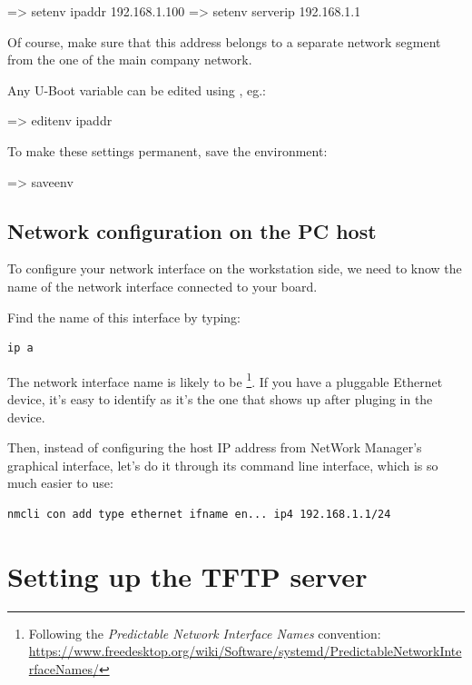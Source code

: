 \begin{ubootinput}
=> setenv ipaddr 192.168.1.100
=> setenv serverip 192.168.1.1
\end{ubootinput}

Of course, make sure that this address belongs to a separate network
segment from the one of the main company network.

Any U-Boot variable can be edited using , eg.:

\begin{ubootinput}
=> editenv ipaddr
\end{ubootinput}

To make these settings permanent, save the environment:

\begin{ubootinput}
=> saveenv
\end{ubootinput}

\subsection{Network configuration on the PC host}

To configure your network interface on the workstation side, we need
to know the name of the network interface connected to your board.

Find the name of this interface by typing:

\begin{verbatim}
ip a
\end{verbatim}

The network interface name is likely to be
\footnote{Following the {\em Predictable Network Interface
Names} convention:
\url{https://www.freedesktop.org/wiki/Software/systemd/PredictableNetworkInterfaceNames/}}.
If you have a pluggable Ethernet device, it's easy to identify as it's
the one that shows up after pluging in the device.

Then, instead of configuring the host IP address from NetWork Manager's
graphical interface, let's do it through its command line interface,
which is so much easier to use:

\begin{verbatim}
nmcli con add type ethernet ifname en... ip4 192.168.1.1/24
\end{verbatim}

\section{Setting up the TFTP server}

